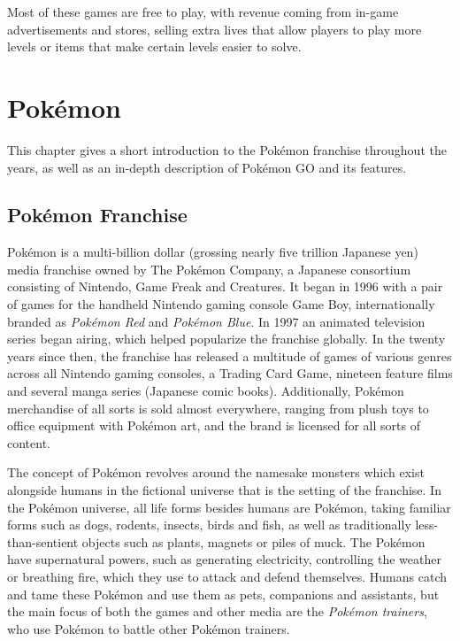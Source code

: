 Most of these games are free to play, with revenue coming from in-game advertisements and stores, selling extra lives that allow players to play more levels or items that make certain levels easier to solve.


\chapter{Pokémon}
\label{chapter:lit-study-pokemon-go}

This chapter gives a short introduction to the Pokémon franchise throughout the years, as well as an in-depth description of Pokémon GO and its features. 

\section{Pokémon Franchise}

Pokémon is a multi-billion dollar (grossing nearly five trillion Japanese yen) media franchise owned by The Pokémon Company, a Japanese consortium consisting of Nintendo, Game Freak and Creatures. It began in 1996 with a pair of games for the handheld Nintendo gaming console Game Boy, internationally branded as \emph{Pokémon Red} and \emph{Pokémon Blue}. In 1997 an animated television series began airing, which helped popularize the franchise globally. In the twenty years since then, the franchise has released a multitude of games of various genres across all Nintendo gaming consoles, a Trading Card Game, nineteen feature films and several manga series (Japanese comic books). Additionally, Pokémon merchandise of all sorts is sold almost everywhere, ranging from plush toys to office equipment with Pokémon art, and the brand is licensed for all sorts of content.

The concept of Pokémon revolves around the namesake monsters which exist alongside humans in the fictional universe that is the setting of the franchise. In the Pokémon universe, all life forms besides humans are Pokémon, taking familiar forms such as dogs, rodents, insects, birds and fish, as well as traditionally less-than-sentient objects such as plants, magnets or piles of muck. The Pokémon have supernatural powers, such as generating electricity, controlling the weather or breathing fire, which they use to attack and defend themselves. Humans catch and tame these Pokémon and use them as pets, companions and assistants, but the main focus of both the games and other media are the \emph{Pokémon trainers}, who use Pokémon to battle other Pokémon trainers.


